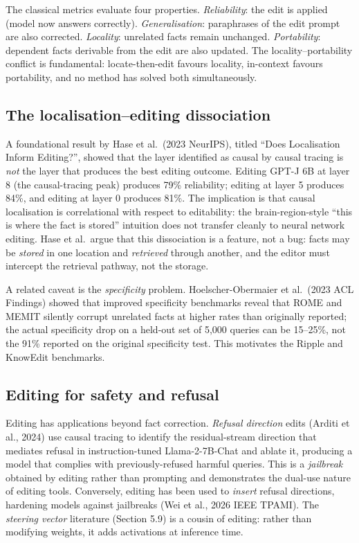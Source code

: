 The classical metrics evaluate four properties. \emph{Reliability}: the edit is applied (model now answers correctly). \emph{Generalisation}: paraphrases of the edit prompt are also corrected. \emph{Locality}: unrelated facts remain unchanged. \emph{Portability}: dependent facts derivable from the edit are also updated. The locality--portability conflict is fundamental: locate-then-edit favours locality, in-context favours portability, and no method has solved both simultaneously.

\subsection{The localisation--editing dissociation}\label{the-localisationediting-dissociation}

A foundational result by Hase et al.~(2023 NeurIPS), titled ``Does Localisation Inform Editing?'', showed that the layer identified as causal by causal tracing is \emph{not} the layer that produces the best editing outcome. Editing GPT-J 6B at layer 8 (the causal-tracing peak) produces 79\% reliability; editing at layer 5 produces 84\%, and editing at layer 0 produces 81\%. The implication is that causal localisation is correlational with respect to editability: the brain-region-style ``this is where the fact is stored'' intuition does not transfer cleanly to neural network editing. Hase et al.~argue that this dissociation is a feature, not a bug: facts may be \emph{stored} in one location and \emph{retrieved} through another, and the editor must intercept the retrieval pathway, not the storage.

A related caveat is the \emph{specificity} problem. Hoelscher-Obermaier et al.~(2023 ACL Findings) showed that improved specificity benchmarks reveal that ROME and MEMIT silently corrupt unrelated facts at higher rates than originally reported; the actual specificity drop on a held-out set of 5,000 queries can be 15--25\%, not the 91\% reported on the original specificity test. This motivates the Ripple and KnowEdit benchmarks.

\subsection{Editing for safety and refusal}\label{editing-for-safety-and-refusal}

Editing has applications beyond fact correction. \emph{Refusal direction} edits (Arditi et al., 2024) use causal tracing to identify the residual-stream direction that mediates refusal in instruction-tuned Llama-2-7B-Chat and ablate it, producing a model that complies with previously-refused harmful queries. This is a \emph{jailbreak} obtained by editing rather than prompting and demonstrates the dual-use nature of editing tools. Conversely, editing has been used to \emph{insert} refusal directions, hardening models against jailbreaks (Wei et al., 2026 IEEE TPAMI). The \emph{steering vector} literature (Section 5.9) is a cousin of editing: rather than modifying weights, it adds activations at inference time.

